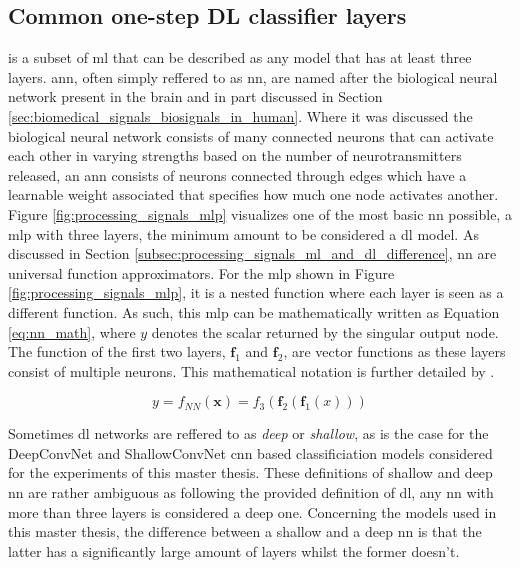 
\subsection{Common one-step DL classifier layers}
\label{subsec:processing_signals_ml_and_dl_dl_classifiers}





 is a subset of \gls{ml} that can be described as any  model that has at least three layers.
\Gls{ann}, often simply reffered to as \gls{nn}, are named after the biological neural network present in the brain and in part discussed in Section \ref{sec:biomedical_signals_biosignals_in_human}.
Where it was discussed the biological neural network consists of many connected neurons that can activate each other in varying strengths based on the number of neurotransmitters released, an \gls{ann} consists of neurons connected through edges which have a learnable weight associated that specifies how much one node activates another.
Figure \ref{fig:processing_signals_mlp} visualizes one of the most basic \gls{nn} possible, a \gls{mlp} with three layers, the minimum amount to be considered a \gls{dl} model.
As discussed in Section \ref{subsec:processing_signals_ml_and_dl_difference}, \gls{nn} are universal function approximators.
For the \gls{mlp} shown in Figure \ref{fig:processing_signals_mlp}, it is a nested function where each layer is seen as a different function.
As such, this \gls{mlp} can be mathematically written as Equation \ref{eq:nn_math}, where $y$ denotes the scalar returned by the singular output node.
The function of the first two layers, $\mathbf{f}_1$ and $\mathbf{f}_2$, are vector functions as these layers consist of multiple neurons.
This mathematical notation is further detailed by \citet{ml_book}.


\begin{equation}
    \label{eq:nn_math}
    y = f_{NN}(\mathbf{x}) = f_3(\mathbf{f}_2(\mathbf{f}_1(x)))
\end{equation}



Sometimes \gls{dl} networks are reffered to as \textit{deep} or \textit{shallow}, as is the case for the DeepConvNet and ShallowConvNet \gls{cnn} based classificiation models considered for the experiments of this master thesis.
These definitions of shallow and deep \gls{nn} are rather ambiguous as following the provided definition of \gls{dl}, any \gls{nn} with more than three layers is considered a deep one.
Concerning the models used in this master thesis, the difference between a shallow and a deep \gls{nn} is that the latter has a significantly large amount of layers whilst the former doesn't.

